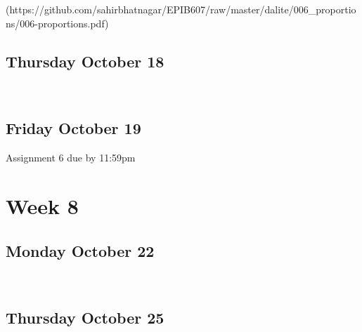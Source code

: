 \documentclass[]{book}
\let\originaltabular\tabular
\let\endoriginaltabular\endtabular
\renewenvironment{tabular}[1]{%
  \begingroup%
  \centering%
  \originaltabular{#1}}%
  {\endoriginaltabular\endgroup}
\theoremstyle{definition}
\theoremstyle{definition}
\theoremstyle{definition}
\theoremstyle{remark}
\begin{document}
\begin{table}[H]
\centering
\begin{tabular}{l}
(https://github.com/sahirbhatnagar/EPIB607/raw/master/dalite/006\_proportions/006-proportions.pdf)\\
\hline
\end{tabular}
\end{table}

\subsection{Thursday October 18}\label{thursday-october-18}

\begin{table}[H]
\centering
\begin{tabular}{l}
\hline
\\
\hline
\end{tabular}
\end{table}

\subsection{Friday October 19}\label{friday-october-19}

\begin{table}[H]
\centering
\begin{tabular}{l}
\hline
Assignment 6 due by 11:59pm\\
\hline
\end{tabular}
\end{table}

\section{Week 8}\label{week-8}

\subsection{Monday October 22}\label{monday-october-22}

\begin{table}[H]
\centering
\begin{tabular}{l}
\hline
\\
\hline
\end{tabular}
\end{table}

\subsection{Thursday October 25}\label{thursday-october-25}
\end{document}
